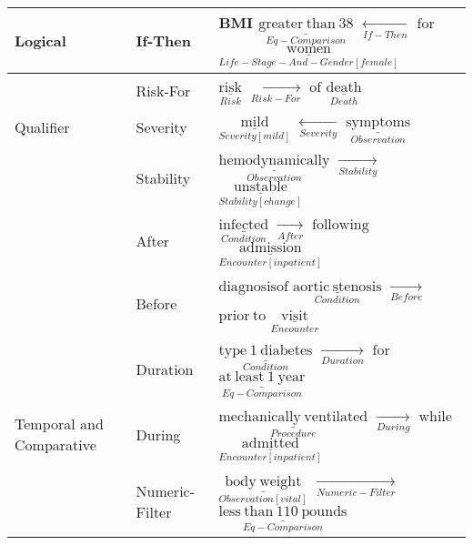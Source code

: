 \begin{tabular}{m{3.8cm} m{2.2cm} m{10cm}}
    \hline
    
    Logical &
        If-Then       & BMI \quad $\underset{Eq-Comparison}{\underline{\mathrm{greater\ than\ 38}}}$ \quad $\xleftarrow[If-Then]{}$ \quad $\mathrm{for}$ \quad $\underset{Life-Stage-And-Gender[female]}{\underline{\mathrm{women}}}$ \\[2ex]
         
    \hline
    
         & Risk-For & $\underset{Risk}{\underline{\mathrm{risk}}}$ \quad $\xrightarrow[Risk-For]{}$ \quad $\mathrm{of}$ \quad $\underset{Death}{\underline{\mathrm{death}}}$ \\
        Qualifier & Severity & $\underset{Severity[mild]}{\underline{\mathrm{mild}}}$ \quad $\xleftarrow[Severity]{}$ \quad $\underset{Observation}{\underline{\mathrm{symptoms}}}$ \\
         & Stability & $\underset{Observation}{\underline{\mathrm{hemodynamically}}}$ \quad $\xrightarrow[Stability]{}$ \quad $\underset{Stability[change]}{\underline{\mathrm{unstable}}}$ \\[2ex]
    
    \hline
    
     &
        After & $\underset{Condition}{\underline{\mathrm{infected}}}$ \quad $\xrightarrow[After]{}$ \quad $\mathrm{following}$ \quad $\underset{Encounter[inpatient]}{\underline{\mathrm{admission}}}$ \\
        
        & Before & $\mathrm{diagnosis of}$ $\underset{Condition}{\underline{\mathrm{aortic\ stenosis}}}$ \quad $\xrightarrow[Before]{}$ \quad $\mathrm{prior\ to}$ \quad $\underset{Encounter}{\underline{\mathrm{visit}}}$ \\
        
        & Duration & $\underset{Condition}{\underline{\mathrm{type\ 1\ diabetes}}}$ \quad $\xrightarrow[Duration]{}$ \quad $\mathrm{for}$ \quad $\underset{Eq-Comparison}{\underline{\mathrm{at\ least\ 1\ year}}}$ \\ 
        Temporal and Comparative & During & $\underset{Procedure}{\underline{\mathrm{mechanically \ ventilated}}}$ \quad $\xrightarrow[During]{}$ \quad $\mathrm{while}$ \quad $\underset{Encounter[inpatient]}{\underline{\mathrm{admitted}}}$ \\
        
         & Numeric-Filter & $\underset{Observation[vital]}{\underline{\mathrm{body\ weight}}}$ \quad $\xrightarrow[Numeric-Filter]{}$ \quad $\underset{Eq-Comparison}{\underline{\mathrm{less\ than\ 110\ pounds}}}$ \\    
        

\end{tabular}
